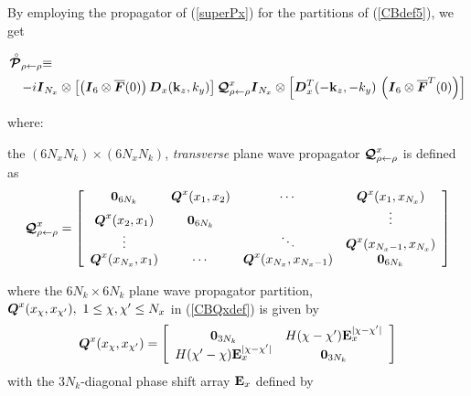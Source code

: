 By employing the propagator of (\ref{superPx}) for the partitions of  (\ref{CBdef5}),
 we get
\begin{samepage}
\begin{eqnarray}	\label{GGx0}
\lefteqn{\rf{\CB P}_{\rho \leftarrow   \rho} \equiv}\\
&&
 -i{\bmi I}_{N_x} \otimes
\left[\left({\bmi I}_6\otimes \overline{\bmi F}(0)  \right)
 {\bmi  D}_{x}({\bf k}_{z},{k}_{y})\right]
 {\CB Q}^{x}_{\rho \leftarrow \rho}
{\bmi I}_{N_x} \otimes \left[{\bmi  D}_{x}^{T}(-{\bf k}_{z},-{k}_{y})
\,\left({\bmi I}_6\otimes \overline{\bmi F}^{T}(0)  \right)
\right]\nonumber
\end{eqnarray}
\end{samepage}
where:
\begin{itemize}
\begin{samepage}
\item the  $(6 N_x N_k) \times (6 N_x N_k)$, {\em transverse\/} 
plane wave propagator ${\mbox{\boldmath$\cal Q$\unboldmath}}^{x}_{\rho \leftarrow \rho}$ is  defined as
\begin{equation} \label{CBQxdef}
{\mbox{\boldmath$\cal Q$\unboldmath}}^{x}_{\rho \leftarrow   \rho}=
\left[{\begin{array}{cccc}
{\bf 0}_{6N_k}&{\mbox{\boldmath$\mit Q$\unboldmath}}^{x}({x}_1,{x}_2)&\cdots 
&{\mbox{\boldmath$\mit Q$\unboldmath}}^{x}({x}_1,{x}_{N_x})\\
{\mbox{\boldmath$\mit Q$\unboldmath}}^{x}({x}_2,{x}_1)&{\bf 
0}_{6N_k}&&\vdots\\
\vdots&&\ddots&{\mbox{\boldmath$\mit Q$\unboldmath}}^{x}({x}_{N_x -1},{x}_{N_x})\\
{\mbox{\boldmath$\mit Q$\unboldmath}}^{x}({x}_{N_x},{x}_{1})&\cdots &
{\mbox{\boldmath$\mit Q$\unboldmath}}^{x}({x}_{N_x},{x}_{N_x-1})&{\bf 0}_{6N_k}
\end{array}}\right]
\end{equation}
\end{samepage}
where the  $6 N_k \times 6 N_k$ plane wave propagator partition, 
${\mbox{\boldmath$\mit Q$\unboldmath}}^{x}({x}_{\chi},{x}_{\chi^{\prime}}), \ 1 \le \chi, \chi^{\prime} \le N_x$ in 
(\ref{CBQxdef}) 
is given by  
\begin{equation} \label{Qxdefg}
{\mbox{\boldmath$\mit Q$\unboldmath}}^{x}({x}_{\chi},{x}_{\chi^{\prime}})=
\left[{\begin{array}{cc}{\bf 0}_{3N_k}&H(\chi - \chi^{\prime}){\bf E}_{x}^{|\chi - \chi^{\prime}|}\\
H(\chi^{\prime}-\chi){\bf E}_{x}^{|\chi - \chi^{\prime}|}&{\bf 0}_{3N_k}\end{array}}\right]
\end{equation}
with the $3 N_k$-diagonal phase shift array ${\bf E}_{x}$ defined by
 \begin{equation} \label{Exdef}

\end{equation}
\end{itemize}
